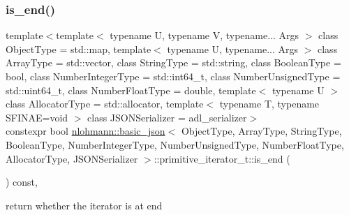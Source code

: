 \subsubsection{\texorpdfstring{is\+\_\+end()}{is\_end()}}
{\footnotesize\ttfamily template$<$template$<$ typename U, typename V, typename... Args $>$ class Object\+Type = std\+::map, template$<$ typename U, typename... Args $>$ class Array\+Type = std\+::vector, class String\+Type  = std\+::string, class Boolean\+Type  = bool, class Number\+Integer\+Type  = std\+::int64\+\_\+t, class Number\+Unsigned\+Type  = std\+::uint64\+\_\+t, class Number\+Float\+Type  = double, template$<$ typename U $>$ class Allocator\+Type = std\+::allocator, template$<$ typename T, typename S\+F\+I\+N\+A\+E=void $>$ class J\+S\+O\+N\+Serializer = adl\+\_\+serializer$>$ \\
constexpr bool \hyperlink{classnlohmann_1_1basic__json}{nlohmann\+::basic\+\_\+json}$<$ Object\+Type, Array\+Type, String\+Type, Boolean\+Type, Number\+Integer\+Type, Number\+Unsigned\+Type, Number\+Float\+Type, Allocator\+Type, J\+S\+O\+N\+Serializer $>$\+::primitive\+\_\+iterator\+\_\+t\+::is\+\_\+end (\begin{DoxyParamCaption}{ }\end{DoxyParamCaption}) const\hspace{0.3cm}{\ttfamily [inline]}, {\ttfamily [noexcept]}}



return whether the iterator is at end 

\mbox{\label{classnlohmann_1_1basic__json_1_1primitive__iterator__t_a08f5a9109131643f0227fe5fb9591c9b}} 
